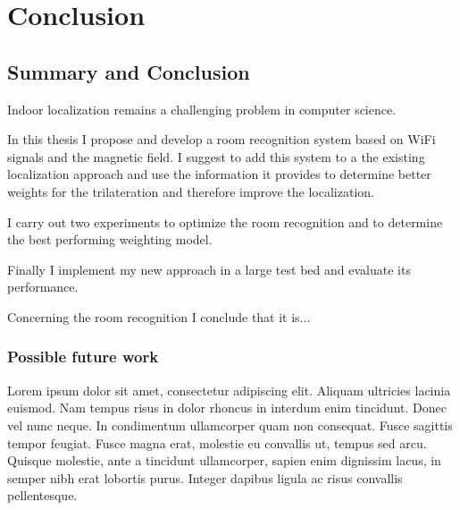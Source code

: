\chapter{Conclusion}

\label{Chapter5}

\section{Summary and Conclusion}


Indoor localization remains a challenging problem in computer science.

In this thesis I propose and develop a room recognition system based on WiFi signals and the magnetic field. I suggest to add this system to a the existing localization approach and use the information it provides to determine better weights for the trilateration and therefore improve the localization.

I carry out two experiments to optimize the room recognition and to determine the best performing weighting model.

Finally I implement my new approach in a large test bed and evaluate its performance.

Concerning the room recognition I conclude that it is...
\subsection{Possible future work}

Lorem ipsum dolor sit amet, consectetur adipiscing elit. Aliquam ultricies lacinia euismod. Nam tempus risus in dolor rhoncus in interdum enim tincidunt. Donec vel nunc neque. In condimentum ullamcorper quam non consequat. Fusce sagittis tempor feugiat. Fusce magna erat, molestie eu convallis ut, tempus sed arcu. Quisque molestie, ante a tincidunt ullamcorper, sapien enim dignissim lacus, in semper nibh erat lobortis purus. Integer dapibus ligula ac risus convallis pellentesque.

